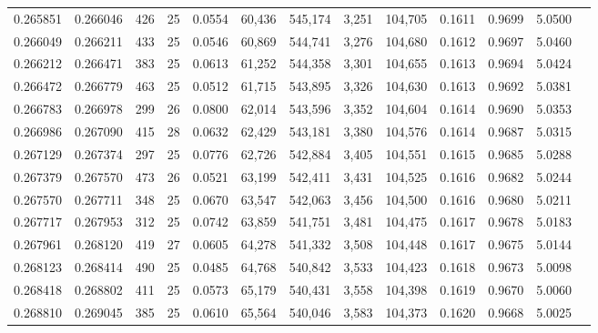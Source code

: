 \begin{tabular}{rrrrrrrrrrrrr}
0.265851 & 0.266046 & 426 &  25 &                                     0.0554 &  60,436 & 545,174 &   3,251 & 104,705 & 0.1611 & 0.9699 & 5.0500 \\
0.266049 & 0.266211 & 433 &  25 &                                     0.0546 &  60,869 & 544,741 &   3,276 & 104,680 & 0.1612 & 0.9697 & 5.0460 \\
0.266212 & 0.266471 & 383 &  25 &                                     0.0613 &  61,252 & 544,358 &   3,301 & 104,655 & 0.1613 & 0.9694 & 5.0424 \\
0.266472 & 0.266779 & 463 &  25 &                                     0.0512 &  61,715 & 543,895 &   3,326 & 104,630 & 0.1613 & 0.9692 & 5.0381 \\
0.266783 & 0.266978 & 299 &  26 &                                     0.0800 &  62,014 & 543,596 &   3,352 & 104,604 & 0.1614 & 0.9690 & 5.0353 \\
0.266986 & 0.267090 & 415 &  28 &                                     0.0632 &  62,429 & 543,181 &   3,380 & 104,576 & 0.1614 & 0.9687 & 5.0315 \\
0.267129 & 0.267374 & 297 &  25 &                                     0.0776 &  62,726 & 542,884 &   3,405 & 104,551 & 0.1615 & 0.9685 & 5.0288 \\
0.267379 & 0.267570 & 473 &  26 &                                     0.0521 &  63,199 & 542,411 &   3,431 & 104,525 & 0.1616 & 0.9682 & 5.0244 \\
0.267570 & 0.267711 & 348 &  25 &                                     0.0670 &  63,547 & 542,063 &   3,456 & 104,500 & 0.1616 & 0.9680 & 5.0211 \\
0.267717 & 0.267953 & 312 &  25 &                                     0.0742 &  63,859 & 541,751 &   3,481 & 104,475 & 0.1617 & 0.9678 & 5.0183 \\
0.267961 & 0.268120 & 419 &  27 &                                     0.0605 &  64,278 & 541,332 &   3,508 & 104,448 & 0.1617 & 0.9675 & 5.0144 \\
0.268123 & 0.268414 & 490 &  25 &                                     0.0485 &  64,768 & 540,842 &   3,533 & 104,423 & 0.1618 & 0.9673 & 5.0098 \\
0.268418 & 0.268802 & 411 &  25 &                                     0.0573 &  65,179 & 540,431 &   3,558 & 104,398 & 0.1619 & 0.9670 & 5.0060 \\
0.268810 & 0.269045 & 385 &  25 &                                     0.0610 &  65,564 & 540,046 &   3,583 & 104,373 & 0.1620 & 0.9668 & 5.0025 \\

\end{tabular}
